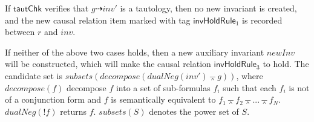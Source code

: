 \documentclass[conference]{IEEEtran}
\def \eqc {\doteq }
\def \andc {\barwedge }
\def \negc {!}
\begin{document}
{\begin{description}[leftmargin=0pt,noitemsep,nolistsep]
\item[(2)] If $\mathsf{ tautChk}$ verifies that $g \dashrightarrow inv'$ is a tautology, then  no new invariant is created, and
the new causal relation item marked with tag
$ \mathsf{invHoldRule}_1$ is recorded between $r$ and $inv$. %


\item[(3)] If neither of the above two cases holds, then a new auxiliary invariant $newInv$ will be constructed, which will make the causal relation $ \mathsf{invHoldRule}_3$  to hold. The candidate set is $subsets(decompose(dualNeg(inv')\andc g))$, where $decompose(f)$ decompose $f$ into a set of sub-formulas $f_i$  such that each $f_i$ is not of a conjunction form and $f$   is semantically equivalent to $f_1 \andc f_2 \andc ... \andc f_N$. $dualNeg(\negc f)$ returns $f$. $subsets(S)$ denotes the power set of $S$.

\end{description}}
\end{document}
